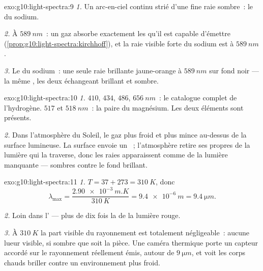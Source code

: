 \begin{solution}{exo:g10:light-spectra:9}
\emph{1.} Un arc-en-ciel continu strié d'une fine raie sombre~: le
 du sodium.

\emph{2.} À $\qty{589}{nm}$~: un gaz absorbe exactement les
 qu'il est capable d'émettre
(\cref{prop:g10:light-spectra:kirchhoff}), et la raie visible forte du
sodium est à $\qty{589}{nm}$.

\emph{3.} Le  du sodium~: une seule raie brillante
jaune-orange à $\qty{589}{nm}$ sur fond noir --- la même
, les deux  échangeant brillant et sombre.
\end{solution}

\begin{solution}{exo:g10:light-spectra:10}
\emph{1.} $410$, $434$, $486$, $\qty{656}{nm}$~: le catalogue complet de
l'hydrogène. $517$ et $\qty{518}{nm}$~: la paire du magnésium. Les deux
éléments sont présents.

\emph{2.} Dans l'atmosphère du Soleil, le gaz plus froid et plus mince
au-dessus de la surface lumineuse. La surface envoie un
~; l'atmosphère retire ses propres
 de la lumière qui la traverse, donc les raies
apparaissent comme de la lumière manquante --- sombres contre le fond
brillant.
\end{solution}

\begin{solution}{exo:g10:light-spectra:11}
\emph{1.} $T = 37 + 273 = \qty{310}{K}$, donc
\[
\lambda_{\max} = \frac{\qty{2.90e-3}{m.K}}{\qty{310}{K}}
= \qty{9.4e-6}{m} = \qty{9.4}{\micro m}.
\]

\emph{2.} Loin dans l' --- plus de dix fois la
 de la lumière rouge.

\emph{3.} À $\qty{310}{K}$ la part visible du rayonnement est
totalement négligeable~: aucune lueur visible, si sombre que soit la
pièce. Une caméra thermique porte un capteur accordé sur le rayonnement
réellement émis, autour de $\qty{9}{\micro m}$, et voit les corps
chauds briller contre un environnement plus froid.
\end{solution}

